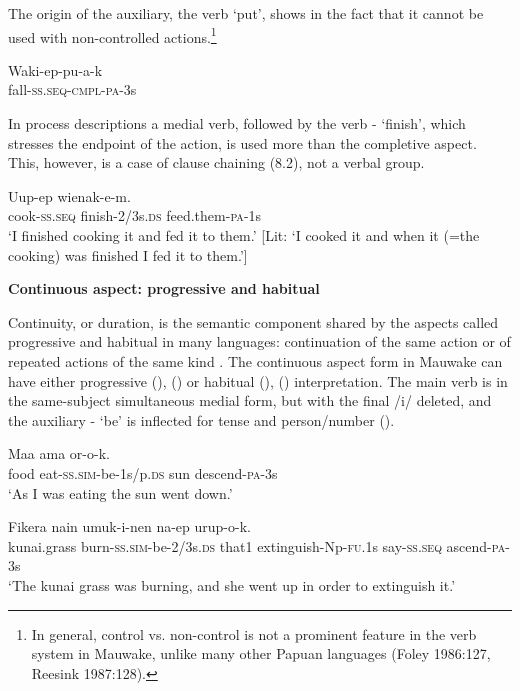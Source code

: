The origin of the auxiliary, the verb `put', shows in the fact that it cannot be used with non-controlled actions.\footnote{In general, control vs. non-control is not a prominent feature in the verb system in Mauwake, unlike many other Papuan languages (Foley 1986:127, Reesink 1987:128).}

\ea%
\label{ex:x365}
\gll *Waki-ep-pu-a-k \\
fall-\textsc{ss}.\textsc{seq}-\textsc{cmpl}-\textsc{pa}-3s\\
\glt
\z

In process descriptions a medial verb, followed by the verb - `finish', which stresses the endpoint of the action, is used more than the completive aspect. This, however, is a case of clause chaining (8.2), not a verbal group.

\ea%
\label{ex:x366}
\gll Uup-ep  wienak-e-m. \\
cook-\textsc{ss}.\textsc{seq} finish-2/3s.\textsc{ds} feed.them-\textsc{pa}-1s\\
\glt`I finished cooking it and fed it to them.' [Lit: `I cooked it and when it (=the cooking) was finished I fed it to them.']
\z

{\bfseries
{}
Continuous aspect: progressive and habitual}

Continuity, or duration, is the semantic component shared by the aspects called progressive and habitual in many languages: continuation of the same action or of repeated actions of the same kind \citep[26]{Comrie1986}. The continuous aspect form in Mauwake can have either progressive (), () or habitual (), () interpretation. The main verb is in the same-subject simultaneous medial form, but with the final /i/ deleted, and the auxiliary - `be' is inflected for tense and person/number (). 

\ea%
\label{ex:x349}
\gll Maa  ama or-o-k. \\
food eat-\textsc{ss}.\textsc{sim}-be-1s/p.\textsc{ds} sun descend-\textsc{pa}-3s \\
\glt`As I was eating the sun went down.'
\z

\ea%
\label{ex:x1044}
\gll Fikera  nain umuk-i-nen na-ep urup-o-k.\\
kunai.grass burn-\textsc{ss}.\textsc{sim}-be-2/3s.\textsc{ds} that1 extinguish-Np-\textsc{fu}.1s say-\textsc{ss}.\textsc{seq} ascend-\textsc{pa}-3s\\
\glt`The kunai grass was burning, and she went up in order to extinguish it.'
\z

